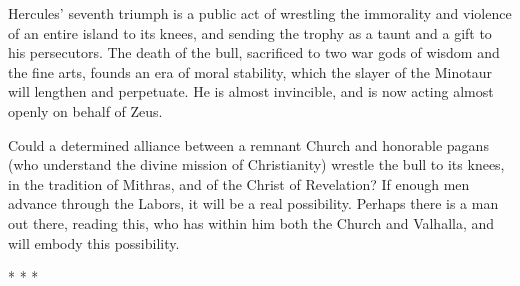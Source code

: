 Hercules' seventh triumph is a public act of wrestling the immorality and violence of an entire island to its knees, and sending the trophy as a taunt and a gift to his persecutors. The death of the bull, sacrificed to two war gods of wisdom and the fine arts, founds an era of moral stability, which the slayer of the Minotaur will lengthen and perpetuate. He is almost invincible, and is now acting almost openly on behalf of Zeus.

Could a determined alliance between a remnant Church and honorable pagans (who understand the divine mission of Christianity) wrestle the bull to its knees, in the tradition of Mithras, and of the Christ of Revelation? If enough men advance through the Labors, it will be a real possibility. Perhaps there is a man out there, reading this, who has within him both the Church and Valhalla, and will embody this possibility.



\begin{center}* * *\end{center}

